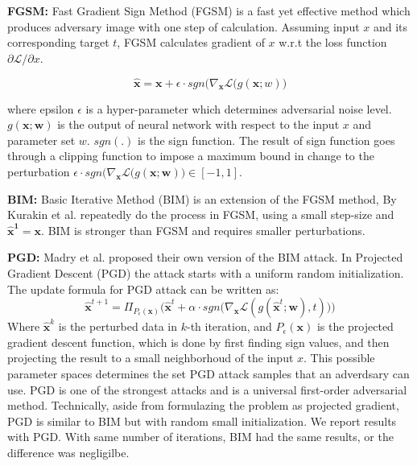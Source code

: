 \textbf{FGSM:} Fast Gradient Sign Method (FGSM) \cite{szegedy2013intriguing}is a fast yet effective method which produces adversary image with one step of calculation. Assuming input $x$ and its corresponding target $t$, FGSM calculates gradient of $x$ w.r.t the loss function ${\partial \mathcal{L}}/ \partial {x}$.

\begin{equation}
\label{eqt:fgsm}
    \bm{\hat{x}} = \bm{x} + \epsilon \cdot sgn\big(\nabla_{\bm{x}}{\mathcal{L}}(g(\bm{x};w)\big)
\end{equation}

where epsilon $\epsilon$ is a hyper-parameter which determines adversarial noise level. $g(\bm{x};\bm{w})$ is the output of neural network with respect to the input $x$ and parameter set $w$. $sgn(.)$ is the sign function. The result of sign function goes through a clipping function to impose a maximum bound in change to the perturbation $\epsilon \cdot sgn\big(\nabla_{\bm{x}}{\mathcal{L}}(g(\bm{x};\bm{w})\big)\in [-1,1]$.

\textbf{BIM:}  Basic Iterative Method (BIM) is an extension of the FGSM method, By Kurakin et al.\cite{kurakin2018adversarial} repeatedly do the process in FGSM, using a small step-size and $\bm{\hat{x}^{1}} = \bm{x}$. BIM is stronger than FGSM and requires smaller perturbations.

\textbf{PGD:} Madry et al. \cite{madry2017towards}proposed their own version of the BIM attack. In Projected Gradient Descent (PGD) \cite{madry2018towards}
the attack starts with a uniform random initialization. The update formula for PGD attack can be written as: 
\begin{equation}
\label{eqt:pgd}
    \bm{\hat{x}}^{t+1}=\Pi_{P_\epsilon(\bm{x})} \Big( \bm{\hat{x}}^t + \alpha \cdot sgn\big(\nabla_{\bm{x}}{\mathcal{L}}(g(\bm{\hat{x}}^t;\bm{w}),t)\big)\Big)
\end{equation}
Where $\bm{\hat{x}}^{k}$ is the perturbed data in $k$-th iteration, and $P_\epsilon(\bm{x})$ is the projected gradient descent function, which is done by first finding sign values, and then projecting the result to a small neighborhoud of the input ${x}$. This possible parameter spaces determines the set PGD attack samples that an adverdsary can use. PGD is one of the strongest attacks and is a universal first-order adversarial method. Technically, aside from formulazing the problem as projected gradient, PGD is similar to BIM but with random small initialization. We report results with PGD. With same number of iterations, BIM had the same results, or the difference was negligilbe.
	
